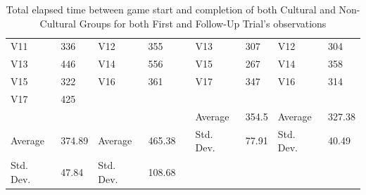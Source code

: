 \begin{table}[ht]
\begin{tabular}{lllllllll}
    \multicolumn{1}{|l|}{V11}       & \multicolumn{1}{l|}{336}        & \multicolumn{1}{l|}{V12}       & \multicolumn{1}{l|}{355}        & \multicolumn{1}{l|}{} & \multicolumn{1}{l|}{V13}       & \multicolumn{1}{l|}{307}        & \multicolumn{1}{l|}{V12}       & \multicolumn{1}{l|}{304}        \\ \cline{1-4} \cline{6-9} 
    \multicolumn{1}{|l|}{V13}       & \multicolumn{1}{l|}{446}        & \multicolumn{1}{l|}{V14}       & \multicolumn{1}{l|}{556}        & \multicolumn{1}{l|}{} & \multicolumn{1}{l|}{V15}       & \multicolumn{1}{l|}{267}        & \multicolumn{1}{l|}{V14}       & \multicolumn{1}{l|}{358}        \\ \cline{1-4} \cline{6-9} 
    \multicolumn{1}{|l|}{V15}       & \multicolumn{1}{l|}{322}        & \multicolumn{1}{l|}{V16}       & \multicolumn{1}{l|}{361}        & \multicolumn{1}{l|}{} & \multicolumn{1}{l|}{V17}       & \multicolumn{1}{l|}{347}        & \multicolumn{1}{l|}{V16}       & \multicolumn{1}{l|}{314}        \\ \cline{1-4} \cline{6-9} 
    \multicolumn{1}{|l|}{V17}       & \multicolumn{1}{l|}{425}        &                                &                                 &                       &                                &                                 &                                &                                 \\ \cline{1-2} \cline{6-9} 
                                    &                                 &                                &                                 & \multicolumn{1}{l|}{} & \multicolumn{1}{l|}{Average}   & \multicolumn{1}{l|}{354.5}      & \multicolumn{1}{l|}{Average}   & \multicolumn{1}{l|}{327.38}     \\ \cline{1-4} \cline{6-9} 
    \multicolumn{1}{|l|}{Average}   & \multicolumn{1}{l|}{374.89}     & \multicolumn{1}{l|}{Average}   & \multicolumn{1}{l|}{465.38}     & \multicolumn{1}{l|}{} & \multicolumn{1}{l|}{Std. Dev.} & \multicolumn{1}{l|}{77.91}      & \multicolumn{1}{l|}{Std. Dev.} & \multicolumn{1}{l|}{40.49}      \\ \cline{1-4} \cline{6-9} 
    \multicolumn{1}{|l|}{Std. Dev.} & \multicolumn{1}{l|}{47.84}      & \multicolumn{1}{l|}{Std. Dev.} & \multicolumn{1}{l|}{108.68}     &                       &                                &                                 &                                &                                 \\ \cline{1-4}
    \end{tabular}
    \caption{\label{tab:Table_TotalGameTimes}Total elapsed time between game start and completion of both Cultural and Non-Cultural Groups for both First and Follow-Up Trial's observations}
    \end{table}
    
